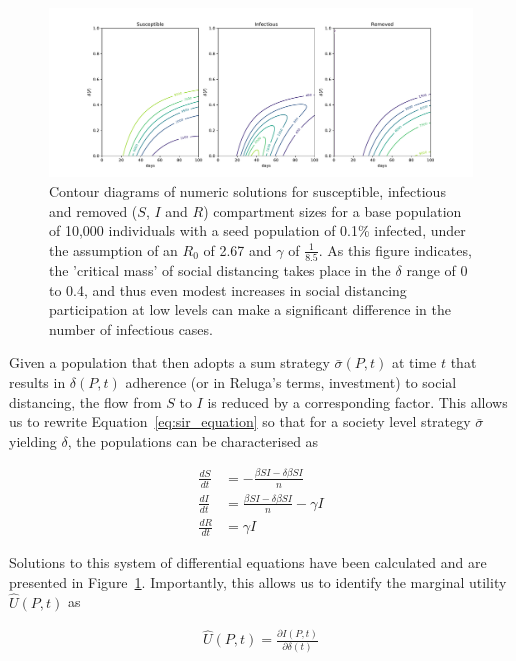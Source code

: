 \documentclass{article}
\begin{document}
\begin{figure}
	\includegraphics[width=\linewidth]{figures/fig3-SIR-by-delta}
	\caption{Contour diagrams of numeric solutions for susceptible, infectious and removed ($S$, $I$ and $R$) compartment sizes for a base population of 10,000 individuals with a seed population of 0.1\% infected, under the assumption of an $R_0$ of 2.67 and $\gamma$ of $\frac{1}{8.5}$. As this figure indicates, the 'critical mass' of social distancing takes place in the $\delta$ range of 0 to 0.4, and thus even modest increases in social distancing participation at low levels can make a significant difference in the number of infectious cases.}
	\label{fig:fig3-SIR-by-delta}
\end{figure}

Given a population that then adopts a sum strategy $\bar{\sigma}(P, t)$ at time $t$ that results in $\delta(P, t)$ adherence (or in Reluga's terms, investment) to social distancing, the flow from $S$ to $I$ is reduced by a corresponding factor. This allows us to rewrite Equation~\eqref{eq:sir_equation} so that for a society level strategy $\bar{\sigma}$ yielding $\delta$, the populations can be characterised as

\begin{equation}
	\begin{aligned}
		\frac{dS}{dt} &= - \frac{\beta S I - \delta \beta S I}{n} 			\\
		\frac{dI}{dt} &= \frac{\beta S I - \delta \beta S I}{n} - \gamma I	\\
		\frac{dR}{dt} &= \gamma I
	\end{aligned}
	\label{eq:sir_with_social_distancing}
\end{equation}

Solutions to this system of differential equations have been calculated and are presented in Figure~\ref{fig:fig3-SIR-by-delta}. Importantly, this allows us to identify the marginal utility $\hat{U}(P, t)$ as

\begin{equation}
	\begin{aligned}
		\hat{U}(P, t) = \frac{\partial I(P, t)}{\partial \delta(t)}
	\end{aligned}
	\label{eq:marginal_utility}
\end{equation}
\end{document}
